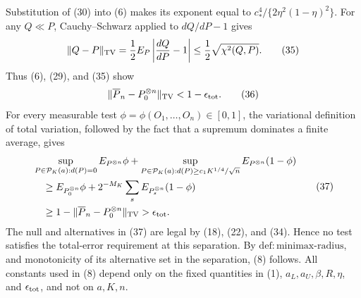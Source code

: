 Substitution of (30) into (6) makes its exponent equal to \(c_*^4/\{2\eta^2(1-\eta)^2\}\).  For any \(Q\ll P\), Cauchy--Schwarz applied to \(dQ/dP-1\) gives
\[
\|Q-P\|_{\rm TV}
=\frac12E_P\left|\frac{dQ}{dP}-1\right|
\le\frac12\sqrt{\chi^2(Q,P)}.
\tag{35}
\]
Thus (6), (29), and (35) show
\[
\|\overline P_n-P_0^{\otimes n}\|_{\rm TV}<1-\epsilon_{\rm tot}.
\tag{36}
\]
For every measurable test \(\phi=\phi(O_1,\ldots,O_n)\in[0,1]\), the variational definition of total variation, followed by the fact that a supremum dominates a finite average, gives
\[
\begin{aligned}
&\sup_{P\in\mathcal P_K(a):d(P)=0}E_{P^{\otimes n}}\phi
+\sup_{P\in\mathcal P_K(a):d(P)\ge c_1K^{1/4}/\sqrt n}
 E_{P^{\otimes n}}(1-\phi) \\
&\quad\ge
E_{P_0^{\otimes n}}\phi
+2^{-M_K}\sum_sE_{P_s^{\otimes n}}(1-\phi) \\
&\quad\ge1-\|\overline P_n-P_0^{\otimes n}\|_{\rm TV}
>\epsilon_{\rm tot}.
\end{aligned}
\tag{37}
\]
The null and alternatives in (37) are legal by (18), (22), and (34).  Hence no test satisfies the total-error requirement at this separation.  By \(\mathrm{def:minimax\mbox{-}radius}\), and monotonicity of its alternative set in the separation, (8) follows.  All constants used in (8) depend only on the fixed quantities in (1), \(a_L,a_U,\beta,R,\eta\), and \(\epsilon_{\rm tot}\), and not on \(a,K,n\).
